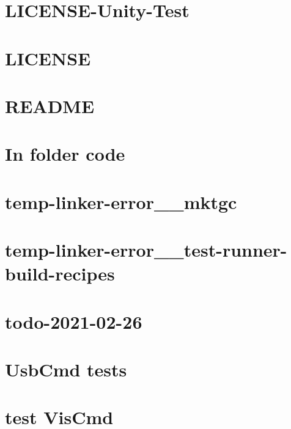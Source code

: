 \let\mypdfximage\pdfximage\def\pdfximage{\immediate\mypdfximage}\documentclass[twoside]{book}
\newcommand{\+}{\discretionary{\mbox{\scriptsize$\hookleftarrow$}}{}{}}
\begin{document}
\chapter{LICENSE-\/\+Unity-\/\+Test}
\label{md_mock_c_LICENSE_Unity_Test}

\chapter{LICENSE}
\label{md_mock_c_LICENSE}

\chapter{README}
\label{md_mock_c_README}

\chapter{In folder code}
\label{md_mock_c_vim_cheatsheet}

\chapter{temp-\/linker-\/error\+\_\+\+\_\+mktgc}
\label{md_temp_linker_error__mktgc}

\chapter{temp-\/linker-\/error\+\_\+\+\_\+test-\/runner-\/build-\/recipes}
\label{md_temp_linker_error__test_runner_build_recipes}

\chapter{todo-\/2021-\/02-\/26}
\label{md_todo_2021_02_26}

\chapter{Usb\+Cmd tests}
\label{md_usb_bridge_build_test_runner}

\chapter{test Vis\+Cmd}
\label{md_vis_spi_out_build_test_runner}

\end{document}
